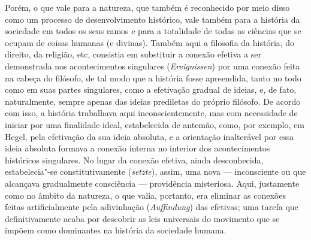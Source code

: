 Porém, o que vale para a natureza, que também é reconhecido por meio
disso como um processo de desenvolvimento histórico, vale também para a
história da sociedade em todos os seus ramos e para a totalidade de
todas as ciências que se ocupam de coisas humanas (e divinas). Também
aqui a filosofia da história, do direito, da religião, etc, consistia em
substituir a conexão efetiva a ser demonstrada nos acontecimentos
singulares (\emph{Ereignissen}) por uma conexão feita na cabeça do
filósofo, de tal modo que a história fosse apreendida, tanto no todo
como em suas partes singulares, como a efetivação gradual de ideias, e,
de fato, naturalmente, sempre apenas das ideias prediletas do próprio
filósofo. De acordo com isso, a história trabalhava aqui
inconscientemente, mas com necessidade de iniciar por uma finalidade
ideal, estabelecida de antemão, como, por exemplo,
em Hegel,
pela efetivação da sua ideia absoluta, e a orientação inalterável por
essa ideia absoluta formava a conexão interna no interior dos
acontecimentos históricos singulares. No lugar da conexão efetiva, ainda
desconhecida, estabelecia"-se constitutivamente (\emph{setzte}), assim,
uma nova --- inconsciente ou que alcançava gradualmente consciência ---
providência misteriosa. Aqui, justamente como no âmbito da natureza, o
que valia, portanto, era eliminar as conexões feitas artificialmente
pela adivinhação (\emph{Auffindung}) das efetivas; uma tarefa que
definitivamente acaba por descobrir as leis universais do movimento que
se impõem como dominantes na história da sociedade humana.

